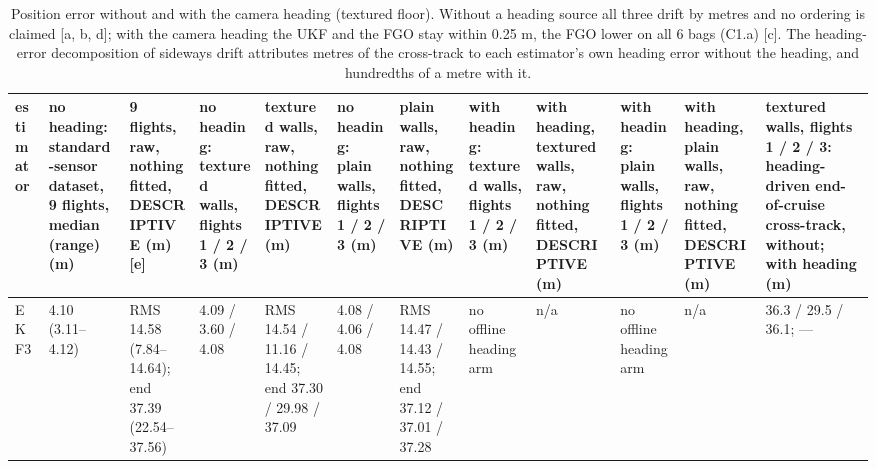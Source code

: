 \begin{table}[htbp]
\centering
\footnotesize
\caption{Position error without and with the camera heading (textured floor). Without a heading source all three drift by metres and no ordering is claimed [a, b, d]; with the camera heading the UKF and the FGO stay within 0.25 m, the FGO lower on all 6 bags (C1.a) [c]. The heading-error decomposition of sideways drift attributes metres of the cross-track to each estimator's own heading error without the heading, and hundredths of a metre with it.}
\label{tab:T2}
\begin{tabular}{p{}p{}p{}p{}p{}p{}p{}p{}p{}p{}p{}p{}}
\toprule
\textbf{estimator} & \textbf{no heading: standard-sensor dataset, 9 flights, median (range) (m)} & \textbf{9 flights, raw, nothing fitted, DESCRIPTIVE (m) [e]} & \textbf{no heading: textured walls, flights 1 / 2 / 3 (m)} & \textbf{textured walls, raw, nothing fitted, DESCRIPTIVE (m)} & \textbf{no heading: plain walls, flights 1 / 2 / 3 (m)} & \textbf{plain walls, raw, nothing fitted, DESCRIPTIVE (m)} & \textbf{with heading: textured walls, flights 1 / 2 / 3 (m)} & \textbf{with heading, textured walls, raw, nothing fitted, DESCRIPTIVE (m)} & \textbf{with heading: plain walls, flights 1 / 2 / 3 (m)} & \textbf{with heading, plain walls, raw, nothing fitted, DESCRIPTIVE (m)} & \textbf{textured walls, flights 1 / 2 / 3: heading-driven end-of-cruise cross-track, without; with heading (m)} \\
\midrule
EKF3 & 4.10 (3.11--4.12) & RMS 14.58 (7.84--14.64); end 37.39 (22.54--37.56) & 4.09 / 3.60 / 4.08 & RMS 14.54 / 11.16 / 14.45; end 37.30 / 29.98 / 37.09 & 4.08 / 4.06 / 4.08 & RMS 14.47 / 14.43 / 14.55; end 37.12 / 37.01 / 37.28 & no offline heading arm & n/a & no offline heading arm & n/a & 36.3 / 29.5 / 36.1; --- \\

\end{tabular}
\end{table}
